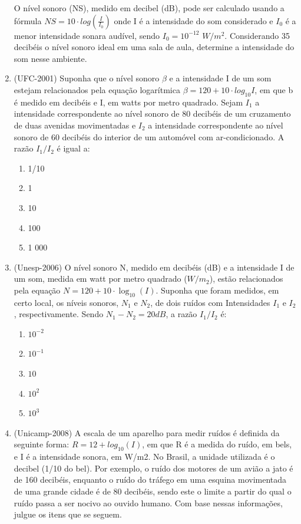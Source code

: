 \begin{enumerate}
 O nível sonoro (NS), medido em decibel (dB), pode ser calculado usando a fórmula $NS=10\cdot log(\frac{I}{I_0})$ onde I 
é a intensidade do som considerado e $I_0$ é a menor intensidade sonara audível, sendo  $I_0=10^{-12}$ $W/m^2$. 
Considerando 35 decibéis o nível sonoro ideal em uma sala de aula, determine a intensidade do som nesse ambiente.


\item {}\label{UFC2001}

(UFC-2001) Suponha que o nível sonoro $\beta$ e a intensidade I de um som estejam relacionados pela equação logarítmica 
$\beta = 120 + 10\cdot log_{10} I$, em que b é medido em decibéis e I, em watts por metro quadrado. Sejam $I_1$ a 
intensidade correspondente ao nível sonoro de 80 decibéis de um cruzamento de duas avenidas movimentadas e $I_2$ a 
intensidade correspondente ao nível sonoro de 60 decibéis do interior de um automóvel com ar-condicionado. A razão 
$I_1/I_2$ é igual a:
 \begin{enumerate}

     \item 1/10
     \item 1
     \item 10 
     \item 100
     \item 1 000
 \end{enumerate}


\item {}\label{Unesp2006}

(Unesp-2006) O nível sonoro N, medido em decibéis (dB) e a intensidade I de um som, medida em watt por metro quadrado 
($W/m_2$), estão relacionados pela equação $N=120+10\cdot \log_{10} (I)$. Suponha que foram medidos, em certo local, os 
níveis sonoros, $N_1$ e $N_2$, de dois ruídos com Intensidades $I_1$ e $I_2$, respectivamente. Sendo $N_1 - N_2 = 20 dB$, 
a razão $I_1/I_2$ é:
\begin{enumerate}
    \item $10^{-2}$
    \item $10^{-1}$
     \item $10$
     \item $10^{2}$
     \item $10^{3}$
\end{enumerate}


\item {} \label{Unicamp2008}

(Unicamp-2008) A escala de um aparelho para medir ruídos é definida da seguinte forma: $R = 12 + log_{10}(I)$, em que R 
é a medida do ruído, em bels, e I é a intensidade sonora, em W/m2. No Brasil, a unidade utilizada é o decibel (1/10 do 
bel). Por exemplo, o ruído dos motores de um avião a jato é de 160 decibéis, enquanto o ruído do tráfego em uma esquina 
movimentada de uma grande cidade é de 80 decibéis, sendo este o limite a partir do qual o ruído passa a ser nocivo ao 
ouvido humano. Com base nessas informações, julgue os itens que se seguem.


\end{enumerate}

